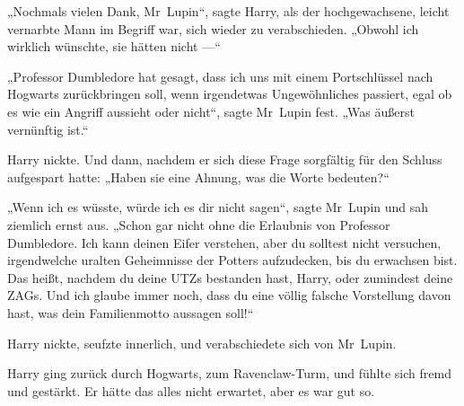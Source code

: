 „Nochmals vielen Dank, Mr~Lupin“, sagte Harry, als der hochgewachsene, leicht vernarbte Mann im Begriff war, sich wieder zu verabschieden.
„Obwohl ich wirklich wünschte, sie hätten nicht —“

„Professor Dumbledore hat gesagt, dass ich uns mit einem Portschlüssel nach Hogwarts zurückbringen soll, wenn irgendetwas Ungewöhnliches passiert, egal ob es wie ein Angriff aussieht oder nicht“, sagte Mr~Lupin fest.
„Was äußerst vernünftig ist.“

Harry nickte. Und dann, nachdem er sich diese Frage sorgfältig für den Schluss aufgespart hatte:
„Haben sie eine Ahnung, was die Worte bedeuten?“

„Wenn ich es wüsste, würde ich es dir nicht sagen“, sagte Mr~Lupin und sah ziemlich ernst aus.
„Schon gar nicht ohne die Erlaubnis von Professor Dumbledore. Ich kann deinen Eifer verstehen, aber du solltest nicht versuchen, irgendwelche uralten Geheimnisse der Potters aufzudecken, bis du erwachsen bist. Das heißt, nachdem du deine UTZs bestanden hast, Harry, oder zumindest deine ZAGs. Und ich glaube immer noch, dass du eine völlig falsche Vorstellung davon hast, was dein Familienmotto aussagen soll!“

Harry nickte, seufzte innerlich, und verabschiedete sich von Mr~Lupin.

\later

Harry ging zurück durch Hogwarts, zum Ravenclaw-Turm, und fühlte sich fremd und gestärkt. Er hätte das alles nicht erwartet, aber es war gut so.

